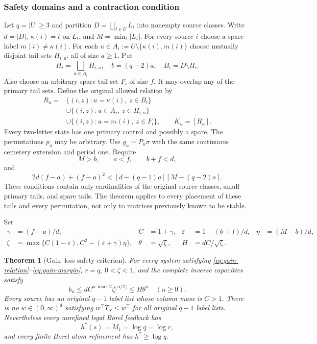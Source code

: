 \documentclass[11pt,reqno]{amsart}
\numberwithin{equation}{section}
\newtheorem{theorem}{Theorem}[section]
\theoremstyle{definition}
\newcommand{\eps}{\varepsilon}
\begin{document}
\subsubsection{Safety domains and a contraction condition}
Let $q=|U|\ge3$ and partition $D=\bigsqcup_{t\in U}L_t$ into
nonempty source classes. Write $d=|D|$,
$\kappa(i)=t$ on $L_t$, and $M=\min_t|L_t|$.
For every source $i$ choose a spare label $m(i)\ne\kappa(i)$.
For each $u\in A_i:=U\setminus\{\kappa(i),m(i)\}$ choose
mutually disjoint tail sets $H_{i,u}$, all of size $a\ge1$.
Put
\[
 H_i=\bigsqcup_{u\in A_i}H_{i,u},\quad b=(q-2)a,\quad
 B_i=D\setminus H_i.
\]
Also choose an arbitrary spare tail set $F_i$ of size $f$.
It may overlap any of the primary tail sets. Define the original
allowed relation by
\begin{align}
 R_u={}&\{(i,z):u=\kappa(i),\ z\in B_i\}\nonumber\\
 &\cup\{(i,z):u\in A_i,\ z\in H_{i,u}\}\label{eq:gain-relation}\\
 &\cup\{(i,z):u=m(i),\ z\in F_i\},\qquad K_u=[R_u].\nonumber
\end{align}
Every two-letter state has one primary control and possibly a spare.
The permutations $p_u$ may be arbitrary. Use $g_u=P_u\sigma$
with the same continuous cemetery extension and period one.
Require
\begin{equation}\label{eq:gain-counts}
 M>b,\qquad a<f,\qquad b+f<d,
\end{equation}
and
\begin{equation}\label{eq:gain-margin}
 2d(f-a)+(f-a)^2<[d-(q-1)a][M-(q-2)a].
\end{equation}
These conditions contain only cardinalities of the original source
classes, small primary tails, and spare tails. The theorem applies
to every placement of these tails and every permutation, not only
to matrices previously known to be stable.

Set
\begin{align}
 \gamma&=(f-a)/d,& C&=1+\gamma,&
 \eps&=1-(b+f)/d,& \eta&=(M-b)/d,\nonumber\\
 \zeta&=\max\{C(1-\eps),C^2-(\eps+\gamma)\eta\},&
 \theta&=\sqrt\zeta,&H&=dC/\sqrt\zeta.
 \label{eq:gain-constants}
\end{align}

\begin{theorem}[Gain--loss safety criterion]\label{thm:gainloss}
For every system satisfying \eqref{eq:gain-relation}--\eqref{eq:gain-margin},
$r=q$, $0<\zeta<1$, and the complete inverse capacities satisfy
\begin{equation}\label{eq:gain-bn}
 b_n\le dC^{n\bmod2}\zeta^{\lfloor n/2\rfloor}
 \le H\theta^n\quad(n\ge0).
\end{equation}
Every source has an original $q-1$ label list whose column mass is
$C>1$. There is no $w\in(0,\infty)^d$ satisfying
$w^\top T_S\le w^\top$ for all original $q-1$ label lists.
Nevertheless every unrefined legal Borel feedback has
\begin{equation}\label{eq:gain-M}
 h^*(s)=M_1=\log q=\log r,
\end{equation}
and every finite Borel atom refinement has $h^*\ge\log q$.
\end{theorem}
\end{document}
